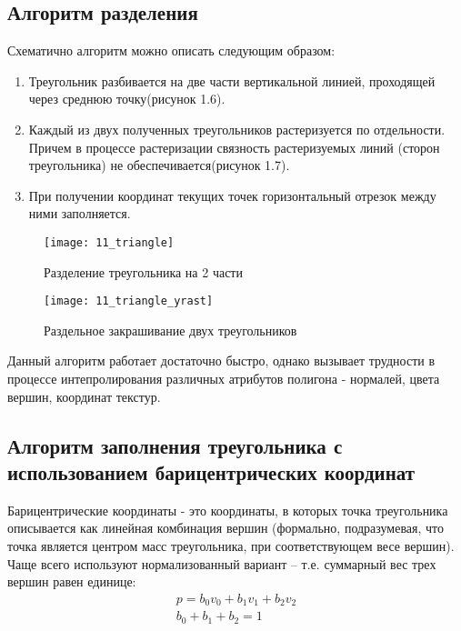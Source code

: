 \documentclass[12pt,a4paper,oneside]{report}
\begin{document}
 	\subsection{Алгоритм разделения}
 	 \quad Схематично алгоритм можно описать следующим образом:
 	\begin{enumerate}
 		\item Треугольник разбивается на две части вертикальной линией, проходящей через среднюю точку(рисунок 1.6).
 		\item Каждый из двух полученных треугольников растеризуется по отдельности. Причем в процессе растеризации связность растеризуемых линий (сторон треугольника) не обеспечивается(рисунок 1.7).
 		\item При получении координат текущих точек горизонтальный отрезок между ними заполняется.
 	\end{enumerate}
 
	\begin{figure}[H]
		\centering
		\texttt{[image: 11\_triangle]}
		\caption{Разделение треугольника на 2 части}
	\end{figure}

	\begin{figure}[H]
		\centering
		\texttt{[image: 11\_triangle\_yrast]}
		\caption{Раздельное закрашивание двух треугольников}
	\end{figure}

	 Данный алгоритм работает достаточно быстро, однако вызывает трудности в процессе интепролирования различных атрибутов полигона - нормалей, цвета вершин, координат текстур.
	
	\subsection{Алгоритм заполнения треугольника с использованием барицентрических координат}
	  \quad Барицентрические координаты - это координаты, в которых точка треугольника описывается как линейная комбинация вершин (формально, подразумевая, что точка является центром масс треугольника, при соответствующем весе вершин). Чаще всего используют нормализованный вариант -- т.е. суммарный вес трех вершин равен единице:
	\begin{equation}
	\begin{gathered}
	p = b_0  v_0 + b_1   v_1 + b_2  v_2\\
	b_0 + b_1 + b_2 = 1
	\end{gathered}
	\end{equation}
	
\end{document}
